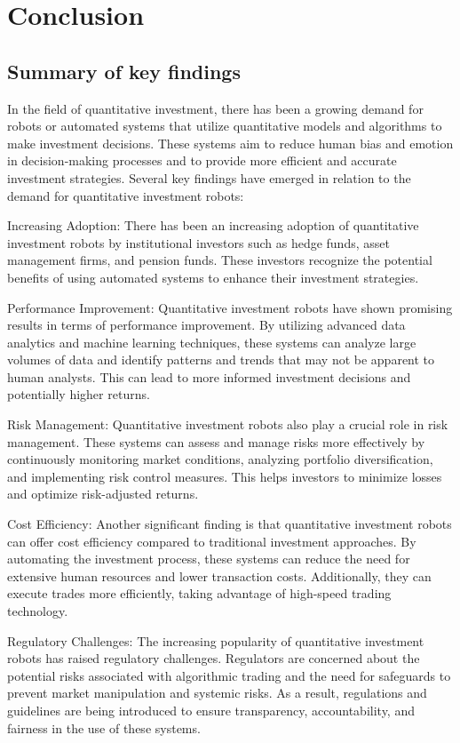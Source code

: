 \documentclass[UTF8]{ctexart}
\begin{document}
\section{Conclusion}
\subsection{Summary of key findings}
In the field of quantitative investment, there has been a growing demand for robots or automated systems that utilize quantitative models and algorithms to make investment decisions. These systems aim to reduce human bias and emotion in decision-making processes and to provide more efficient and accurate investment strategies. Several key findings have emerged in relation to the demand for quantitative investment robots:

Increasing Adoption: There has been an increasing adoption of quantitative investment robots by institutional investors such as hedge funds, asset management firms, and pension funds. These investors recognize the potential benefits of using automated systems to enhance their investment strategies.

Performance Improvement: Quantitative investment robots have shown promising results in terms of performance improvement. By utilizing advanced data analytics and machine learning techniques, these systems can analyze large volumes of data and identify patterns and trends that may not be apparent to human analysts. This can lead to more informed investment decisions and potentially higher returns.

Risk Management: Quantitative investment robots also play a crucial role in risk management. These systems can assess and manage risks more effectively by continuously monitoring market conditions, analyzing portfolio diversification, and implementing risk control measures. This helps investors to minimize losses and optimize risk-adjusted returns.

Cost Efficiency: Another significant finding is that quantitative investment robots can offer cost efficiency compared to traditional investment approaches. By automating the investment process, these systems can reduce the need for extensive human resources and lower transaction costs. Additionally, they can execute trades more efficiently, taking advantage of high-speed trading technology.

Regulatory Challenges: The increasing popularity of quantitative investment robots has raised regulatory challenges. Regulators are concerned about the potential risks associated with algorithmic trading and the need for safeguards to prevent market manipulation and systemic risks. As a result, regulations and guidelines are being introduced to ensure transparency, accountability, and fairness in the use of these systems.
\end{document}
